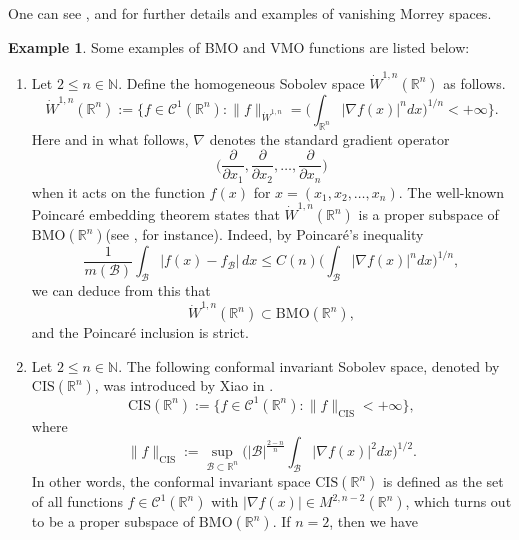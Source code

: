 \documentclass[10pt, reqno]{amsart}
\theoremstyle{definition}
\newtheorem{example}[theorem]{Example}
\theoremstyle{remark}
\numberwithin{equation}{section}
\begin{document}
One can see \cite{ak}, \cite{ragusa} and \cite{Samko} for further details and examples of vanishing Morrey spaces.
\begin{example}
Some examples of BMO and VMO functions are listed below:
\begin{enumerate}
	\item Let $2\leq n\in \mathbb{N}$. Define the homogeneous Sobolev space $\dot{W}^{1,n}(\mathbb R^n)$ as follows.
\begin{equation*}
\dot{W}^{1,n}(\mathbb R^n):=\bigg\{f\in \mathcal{C}^{1}(\mathbb R^n):\|f\|_{\dot{W}^{1,n}}=\bigg(\int_{\mathbb R^n}|\nabla f(x)|^ndx\bigg)^{1/n}<+\infty\bigg\}.
\end{equation*}
Here and in what follows, $\nabla$ denotes the standard gradient operator
\begin{equation*}
\Big(\frac{\partial}{\partial x_1},\frac{\partial}{\partial x_2},\dots,\frac{\partial}{\partial x_n}\Big)
\end{equation*}
when it acts on the function $f(x)$ for $x=(x_1,x_2,\dots,x_n)$. The well-known Poincar\'{e} embedding theorem states that $\dot{W}^{1,n}(\mathbb R^n)$ is a proper subspace of $\mathrm{BMO}(\mathbb R^n)$(see \cite[Theorem 4.1]{xiao1}, \cite[Theorem 1.4]{xiao2} for instance). Indeed, by Poincar\'{e}'s inequality
\begin{equation*}
\frac{1}{m(\mathcal{B})}\int_{\mathcal{B}}|f(x)-f_{\mathcal{B}}|\,dx\leq C(n)\bigg(\int_{\mathcal{B}}|\nabla f(x)|^ndx\bigg)^{1/n},
\end{equation*}
we can deduce from this that
\begin{equation*}
\dot{W}^{1,n}(\mathbb R^n)\subset\mathrm{BMO}(\mathbb R^n),
\end{equation*}
and the Poincar\'{e} inclusion is strict.
    \item Let $2\leq n\in \mathbb{N}$. The following conformal invariant Sobolev space, denoted by $\mathrm{CIS}(\mathbb R^n)$, was introduced by Xiao in \cite{xiao1}.
\begin{equation*}
\mathrm{CIS}(\mathbb R^n):=\bigg\{f\in\mathcal{C}^{1}(\mathbb R^n):\|f\|_{\mathrm{CIS}}<+\infty\bigg\},
\end{equation*}
where
\begin{equation*}
\|f\|_{\mathrm{CIS}}:=\sup_{\mathcal{B}\subset\mathbb R^n}\bigg(|\mathcal{B}|^{\frac{2-n}{n}}\int_{\mathcal{B}}|\nabla f(x)|^2dx\bigg)^{1/2}.
\end{equation*}
In other words, the conformal invariant space $\mathrm{CIS}(\mathbb R^n)$ is defined as the set of all functions $f\in\mathcal{C}^{1}(\mathbb R^n)$ with $|\nabla f(x)|\in M^{2,n-2}(\mathbb R^n)$, which turns out to be a proper subspace of $\mathrm{BMO}(\mathbb R^n)$. If $n=2$, then we have

\end{enumerate}
\end{example}
\end{document}
